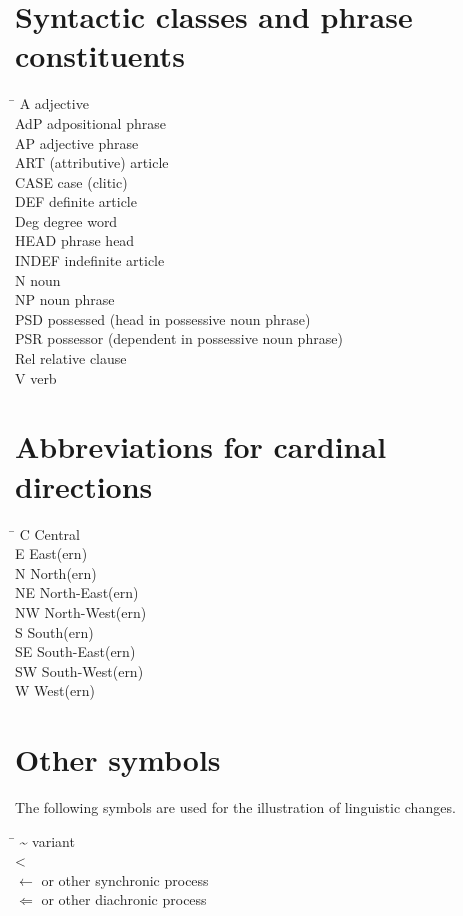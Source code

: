 \section*{Syntactic classes and phrase constituents}
\begin{tabbing}
\TABh \= \kill
{A} \> adjective\\
{AdP} \> adpositional phrase\\
{AP} \> adjective phrase\\
{ART} \> (attributive) article\\
{CASE} \> case (clitic)\\
{DEF} \> definite article\\
{Deg} \> degree word\\
{HEAD} \> phrase head\\
{INDEF} \> indefinite article\\
{N} \> noun\\
{NP} \> noun phrase\\
{PSD} \> possessed (head in possessive noun phrase)\\ 
{PSR} \> possessor (dependent in possessive noun phrase)\\
{Rel} \> relative clause\\
{V} \> verb\\
\end{tabbing}
\section*{Abbreviations for cardinal directions}
\begin{multicols}{2}
\begin{tabbing}
\TABh \= \kill
{C} \> Central\\
{E} \> East(ern)\\
{N} \> North(ern)\\
{NE} \> North-East(ern)\\
{NW} \> North-West(ern)\\
{S} \> South(ern)\\
{SE} \> South-East(ern)\\
{SW} \> South-West(ern)\\
{W} \> West(ern)\\
\end{tabbing}
\end{multicols}
\section*{Other symbols}
The following symbols are used for the illustration of linguistic changes.
\begin{tabbing}
\TABh \= \kill
\textasciitilde \> variant\\
<  \> \\
$\leftarrow$  \>  or other synchronic process\\
$\Leftarrow$  \>  or other diachronic process\footnotemark\\
\end{tabbing}

